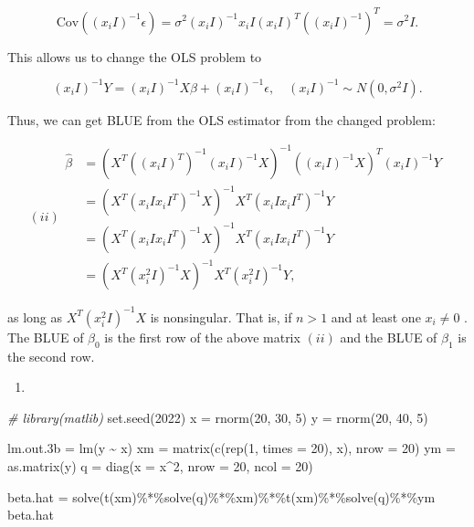 \documentclass[
]{article}
\newenvironment{Shaded}{\begin{snugshade}}{\end{snugshade}}
\newcommand{\AttributeTok}[1]{\textcolor[rgb]{0.77,0.63,0.00}{#1}}
\newcommand{\CommentTok}[1]{\textcolor[rgb]{0.56,0.35,0.01}{\textit{#1}}}
\newcommand{\DecValTok}[1]{\textcolor[rgb]{0.00,0.00,0.81}{#1}}
\newcommand{\FloatTok}[1]{\textcolor[rgb]{0.00,0.00,0.81}{#1}}
\newcommand{\FunctionTok}[1]{\textcolor[rgb]{0.00,0.00,0.00}{#1}}
\newcommand{\NormalTok}[1]{#1}
\newcommand{\OtherTok}[1]{\textcolor[rgb]{0.56,0.35,0.01}{#1}}
\newcommand{\SpecialCharTok}[1]{\textcolor[rgb]{0.00,0.00,0.00}{#1}}
\providecommand{\tightlist}{%
  \setlength{\itemsep}{0pt}\setlength{\parskip}{0pt}}
\begin{document}
\[
\text{Cov}((x_i I)^{-1} \epsilon) = \sigma^2 (x_iI)^{-1} x_i I (x_i I)^T ((x_i I )^{-1})^T = \sigma^2 I.
\]

This allows us to change the OLS problem to

\[
(x_i I)^{-1}Y = (x_i I)^{-1}X \beta + (x_i I)^{-1} \epsilon, \quad (x_i I)^{-1} \sim N(0, \sigma^2 I).
\]

Thus, we can get BLUE from the OLS estimator from the changed problem:

\[ (ii)
\begin{aligned}
\hat\beta &= (X^T((x_i I)^T)^{-1} (x_i I)^{-1} X)^{-1}((x_i I)^{-1} X)^T (x_i I)^{-1} Y \\
&= (X^T (x_i I x_i I^T)^{-1} X)^{-1} X^T (x_i I x_i I^T)^{-1} Y \\
&= (X^T (x_i I x_i I^T)^{-1} X)^{-1} X^T (x_i I x_i I^T)^{-1} Y \\
&= (X^T(x_i ^2 I)^{-1} X)^{-1} X^T(x_i^2 I)^{-1} Y,
\end{aligned}
\]

as long as \(X^T (x_i^2 I)^{-1}X\) is nonsingular. That is, if \(n > 1\)
and at least one \(x_i \neq 0\) . The BLUE of \(\beta_0\) is the first
row of the above matrix \((ii)\) and the BLUE of \(\beta_1\) is the
second row.

\begin{enumerate}
\def\labelenumi{(\alph{enumi})}
\setcounter{enumi}{1}
\tightlist
\item
\end{enumerate}

\begin{Shaded}
\begin{Highlighting}[]
\CommentTok{\# library(matlib)}
\FunctionTok{set.seed}\NormalTok{(}\DecValTok{2022}\NormalTok{)}
\NormalTok{x }\OtherTok{=} \FunctionTok{rnorm}\NormalTok{(}\DecValTok{20}\NormalTok{, }\DecValTok{30}\NormalTok{, }\DecValTok{5}\NormalTok{)}
\NormalTok{y }\OtherTok{=} \FunctionTok{rnorm}\NormalTok{(}\DecValTok{20}\NormalTok{, }\DecValTok{40}\NormalTok{, }\DecValTok{5}\NormalTok{)}


\NormalTok{lm.out}\FloatTok{.3}\NormalTok{b }\OtherTok{=} \FunctionTok{lm}\NormalTok{(y }\SpecialCharTok{\textasciitilde{}}\NormalTok{ x)}
\NormalTok{xm }\OtherTok{=} \FunctionTok{matrix}\NormalTok{(}\FunctionTok{c}\NormalTok{(}\FunctionTok{rep}\NormalTok{(}\DecValTok{1}\NormalTok{, }\AttributeTok{times =} \DecValTok{20}\NormalTok{), x), }\AttributeTok{nrow =} \DecValTok{20}\NormalTok{)}
\NormalTok{ym }\OtherTok{=} \FunctionTok{as.matrix}\NormalTok{(y)}
\NormalTok{q  }\OtherTok{=} \FunctionTok{diag}\NormalTok{(}\AttributeTok{x =}\NormalTok{ x}\SpecialCharTok{\^{}}\DecValTok{2}\NormalTok{, }\AttributeTok{nrow =} \DecValTok{20}\NormalTok{, }\AttributeTok{ncol =} \DecValTok{20}\NormalTok{)}

\NormalTok{beta.hat }\OtherTok{=} \FunctionTok{solve}\NormalTok{(}\FunctionTok{t}\NormalTok{(xm)}\SpecialCharTok{\%*\%}\FunctionTok{solve}\NormalTok{(q)}\SpecialCharTok{\%*\%}\NormalTok{xm)}\SpecialCharTok{\%*\%}\FunctionTok{t}\NormalTok{(xm)}\SpecialCharTok{\%*\%}\FunctionTok{solve}\NormalTok{(q)}\SpecialCharTok{\%*\%}\NormalTok{ym}
\NormalTok{beta.hat}
\end{Highlighting}
\end{Shaded}
\end{document}
